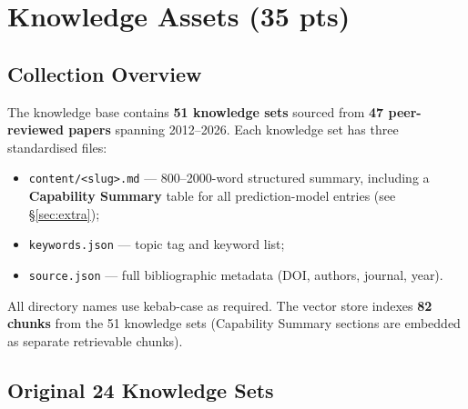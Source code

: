 \documentclass[12pt, a4paper]{article}
\begin{document}
\section{Knowledge Assets (35 pts)}

\subsection{Collection Overview}

The knowledge base contains \textbf{51 knowledge sets} sourced from \textbf{47 peer-reviewed
papers} spanning 2012--2026.  Each knowledge set has three standardised files:
\begin{itemize}[nosep]
  \item \texttt{content/<slug>.md} --- 800--2000-word structured summary, including a
        \textbf{Capability Summary} table for all prediction-model entries (see \S\ref{sec:extra});
  \item \texttt{keywords.json} --- topic tag and keyword list;
  \item \texttt{source.json} --- full bibliographic metadata (DOI, authors, journal, year).
\end{itemize}
All directory names use kebab-case as required.
The vector store indexes \textbf{82 chunks} from the 51 knowledge sets
(Capability Summary sections are embedded as separate retrievable chunks).

\subsection{Original 24 Knowledge Sets}
\end{document}
